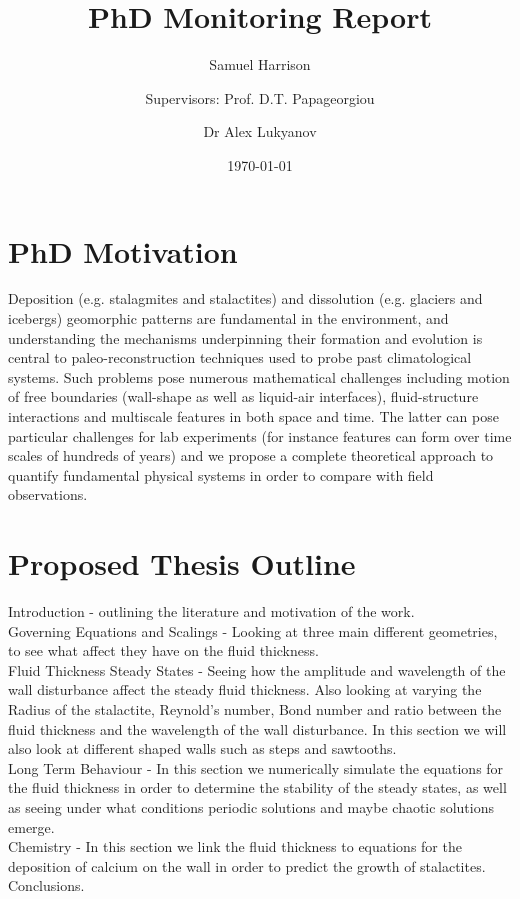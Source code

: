 \documentclass[12pt]{article}
\title{PhD Monitoring Report}
\author[1,2]{Samuel  Harrison}
\author[2]{\authorcr Supervisors: Prof. D.T. Papageorgiou}
\author[1]{\authorcr Dr Alex Lukyanov }
\affil[1]{ University of Reading}
\affil[2]{Imperial College London}
\date{\today}
\begin{document}
	\maketitle
	\section{PhD Motivation}
Deposition (e.g. stalagmites and stalactites) and dissolution (e.g. glaciers and icebergs) geomorphic patterns are fundamental in the environment,
and understanding the mechanisms underpinning their formation and evolution is central to paleo-reconstruction techniques used to
probe past climatological systems. Such problems pose numerous mathematical challenges including motion of free boundaries (wall-shape as well
as liquid-air interfaces), fluid-structure interactions and multiscale features in both space and time. The latter can pose particular challenges for
lab experiments (for instance features can form over time scales of hundreds of years) and we propose a complete theoretical approach
to quantify fundamental physical systems in order to compare with field observations.

\section{Proposed Thesis Outline}
Introduction - outlining the literature and motivation of the work. \\
Governing Equations and Scalings - Looking at three main different geometries, to see what affect they have on the fluid thickness.\\
Fluid Thickness Steady States - Seeing how the amplitude and wavelength of the wall disturbance affect the steady fluid thickness. Also looking at varying the Radius of the stalactite, Reynold's number, Bond number and ratio between the fluid thickness and the wavelength of the wall disturbance. In this section we will also look at different shaped walls such as steps and sawtooths.\\
Long Term Behaviour - In this section we numerically simulate the equations for the fluid thickness in order to determine the stability of the steady states, as well as seeing under what conditions periodic solutions and maybe chaotic solutions emerge. \\
Chemistry - In this section we link the fluid thickness to equations for the deposition of calcium on the wall in order to predict the growth of stalactites. \\
Conclusions.
 
\end{document}
